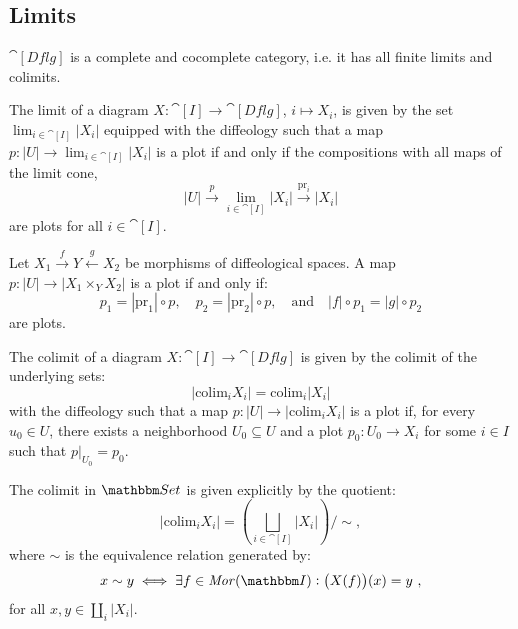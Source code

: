 \documentclass[a4paper,11pt]{article}  %
\newcommand{\Dflg}{\cat[Dflg]}
\begin{document}
\subsection{Limits}
$\Dflg$ is a complete and cocomplete category, i.e. it has all finite limits and colimits.

\begin{proposition}
The limit of a diagram \(X : \cat[I] \to \Dflg\), \(i \mapsto X_i\), is given by the set \(\lim_{i \in \cat[I]} |X_i|\) equipped with the diffeology such that a map \(p : |U| \to \lim_{i \in \cat[I]} |X_i|\) is a plot if and only if the compositions  with all maps of the limit cone,
$$
|U| \xrightarrow{p} \lim_{i \in \cat[I]} |X_i| \xrightarrow{\mathrm{pr}_i} |X_i|
$$
are plots for all \(i \in \cat[I]\).
\end{proposition}

\begin{example}[Pullbacks]\label{ex:dflg-pullback}
	Let \(X_1 \xrightarrow{f} Y \xleftarrow{g} X_2\) be morphisms of diffeological spaces. A map \(p : |U| \to |X_1 \times_Y X_2|\) is a plot if and only if:
	$$
		p_1 = |\mathrm{pr}_1| \circ p, \quad p_2 = |\mathrm{pr}_2| \circ p, \quad \text{and} \quad |f| \circ p_1 = |g| \circ p_2
	$$
	are plots.
\end{example}

\begin{proposition}
	The colimit of a diagram \(X : \cat[I] \to \Dflg\) is given by the colimit of the underlying sets:
	$$
		|\mathrm{colim}_i X_i| = \mathrm{colim}_i |X_i|
	$$
with the diffeology such that a map \(p : |U| \to |\mathrm{colim}_i X_i|\) is a plot if, for every \(u_0 \in U\), there exists a neighborhood \(U_0 \subseteq U\) and a plot \(p_0 :  U_0 \to X_i\) for some \(i \in I\) such that \(p|_{U_0} = p_0\).
\end{proposition}

\begin{remark}
The colimit in $\Set$ is given explicitly by the quotient:
$$
|\mathrm{colim}_i X_i| = \left( \bigsqcup_{i \in \cat[I]} |X_i| \right) / \sim,
$$
where \(\sim\) is the equivalence relation generated by:
$$
x \sim y \iff \exists f \in \Mor(\cat[I]) : \big(X(f)\big)(x) = y~,
$$
for all $x,y \in \coprod_i \vert X_i\vert$.
\end{remark}
\end{document}
